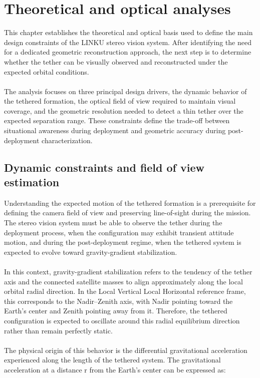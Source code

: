 \chapter{Theoretical and optical analyses}
\label{chap:theoretical-optical-analyses}

This chapter establishes the theoretical and optical basis used to define the main design constraints of the LINKU stereo vision system. After identifying the need for a dedicated geometric reconstruction approach, the next step is to determine whether the tether can be visually observed and reconstructed under the expected orbital conditions.
\\\\
The analysis focuses on three principal design drivers, the dynamic behavior of the tethered formation, the optical field of view required to maintain visual coverage, and the geometric resolution needed to detect a thin tether over the expected separation range. These constraints define the trade-off between situational awareness during deployment and geometric accuracy during post-deployment characterization.

\section{Dynamic constraints and field of view estimation}

Understanding the expected motion of the tethered formation is a prerequisite for defining the camera field of view and preserving line-of-sight during the mission. The stereo vision system must be able to observe the tether during the deployment process, when the configuration may exhibit transient attitude motion, and during the post-deployment regime, when the tethered system is expected to evolve toward gravity-gradient stabilization.
\\\\
In this context, gravity-gradient stabilization refers to the tendency of the tether axis and the connected satellite masses to align approximately along the local orbital radial direction. In the Local Vertical Local Horizontal reference frame, this corresponds to the Nadir--Zenith axis, with Nadir pointing toward the Earth's center and Zenith pointing away from it. Therefore, the tethered configuration is expected to oscillate around this radial equilibrium direction rather than remain perfectly static.
\\\\
The physical origin of this behavior is the differential gravitational acceleration experienced along the length of the tethered system. The gravitational acceleration at a distance r from the Earth's center can be expressed as:

